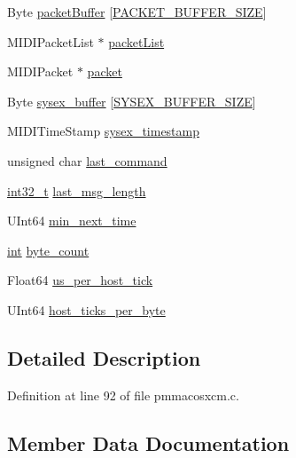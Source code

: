 \begin{DoxyCompactItemize}
Byte \hyperlink{structmidi__macosxcm__struct_a0f23c8779a1b2890e657bfaf0dfcc462}{packet\+Buffer} \mbox{[}\hyperlink{pmmacosxcm_8c_ab30af815d6e9494361629440f14e3716}{P\+A\+C\+K\+E\+T\+\_\+\+B\+U\+F\+F\+E\+R\+\_\+\+S\+I\+ZE}\mbox{]}
\item 
M\+I\+D\+I\+Packet\+List $\ast$ \hyperlink{structmidi__macosxcm__struct_ac5176780d36fd79cf257c95f5e51a40e}{packet\+List}
\item 
M\+I\+D\+I\+Packet $\ast$ \hyperlink{structmidi__macosxcm__struct_afaacc33d2072c0c58e110487f2d9442f}{packet}
\item 
Byte \hyperlink{structmidi__macosxcm__struct_a6fef1633a59357667e31d355a7a14939}{sysex\+\_\+buffer} \mbox{[}\hyperlink{pmmacosxcm_8c_a1d8bc4eae0955327e214d935e00eb3d7}{S\+Y\+S\+E\+X\+\_\+\+B\+U\+F\+F\+E\+R\+\_\+\+S\+I\+ZE}\mbox{]}
\item 
M\+I\+D\+I\+Time\+Stamp \hyperlink{structmidi__macosxcm__struct_a2b40358acace8116d0a90afd4d783315}{sysex\+\_\+timestamp}
\item 
unsigned char \hyperlink{structmidi__macosxcm__struct_a3b158048a015bcd9c381f5c2a46e56d2}{last\+\_\+command}
\item 
\hyperlink{lib-src_2ffmpeg_2win32_2stdint_8h_a37994e3b11c72957c6f454c6ec96d43d}{int32\+\_\+t} \hyperlink{structmidi__macosxcm__struct_a9bf23e7aec7e041e906193a05c761f96}{last\+\_\+msg\+\_\+length}
\item 
U\+Int64 \hyperlink{structmidi__macosxcm__struct_aa3c3646a9072478138f298c0d7c3b719}{min\+\_\+next\+\_\+time}
\item 
\hyperlink{xmltok_8h_a5a0d4a5641ce434f1d23533f2b2e6653}{int} \hyperlink{structmidi__macosxcm__struct_aaa63b528bc4edd457c6846205effa018}{byte\+\_\+count}
\item 
Float64 \hyperlink{structmidi__macosxcm__struct_a2cc5977ceb33764ca22dd94263693437}{us\+\_\+per\+\_\+host\+\_\+tick}
\item 
U\+Int64 \hyperlink{structmidi__macosxcm__struct_aaca519f457e8f6c122a53bb5a00ed969}{host\+\_\+ticks\+\_\+per\+\_\+byte}
\end{DoxyCompactItemize}


\subsection{Detailed Description}


Definition at line 92 of file pmmacosxcm.\+c.



\subsection{Member Data Documentation}

